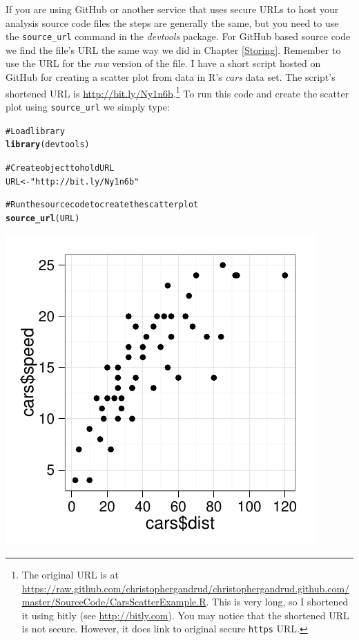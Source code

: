 \documentclass[ChapterTOCs,krantz1]{krantz}\usepackage{graphicx, color}
\makeatletter
\def\maxwidth{ %
  \ifdim\Gin@nat@width>\linewidth
    \linewidth
  \else
    \Gin@nat@width
  \fi
}
\newcommand{\hlfunctioncall}[1]{\textcolor[rgb]{0.501960784313725,0,0.329411764705882}{\textbf{#1}}}%
\newcommand{\hlstring}[1]{\textcolor[rgb]{0.6,0.6,1}{#1}}%
\newcommand{\hlcomment}[1]{\textcolor[rgb]{0.180392156862745,0.6,0.341176470588235}{#1}}%
\newenvironment{kframe}{%
 \def\at@end@of@kframe{}%
 \ifinner\ifhmode%
  \def\at@end@of@kframe{\end{minipage}}%
  \begin{minipage}{\columnwidth}%
 \fi\fi%
 \def\FrameCommand##1{\hskip\@totalleftmargin \hskip-\fboxsep
 \colorbox{shadecolor}{##1}\hskip-\fboxsep
     \hskip-\linewidth \hskip-\@totalleftmargin \hskip\columnwidth}%
 \MakeFramed {\advance\hsize-\width
   \@totalleftmargin\z@ \linewidth\hsize
   \@setminipage}}%
 {\par\unskip\endMakeFramed%
 \at@end@of@kframe}
\newenvironment{knitrout}{}{} %
\makeatother
\begin{document}
If you are using GitHub or another service that uses secure URLs to host your analysis source code files the steps are generally the same, but you need to use the \texttt{source\_url} command in the {\emph{devtools}} package. For GitHub based source code we find the file's URL the same way we did in Chapter \ref{Storing}. Remember to use the URL for the {\emph{raw}} version of the file. I have a short script hosted on GitHub for creating a scatter plot from data in R's {\emph{cars}} data set. The script's shortened URL is \url{http://bit.ly/Ny1n6b}.\footnote{The original URL is at \url{https://raw.github.com/christophergandrud/christophergandrud.github.com/master/SourceCode/CarsScatterExample.R}. This is very long, so I shortened it using bitly (see \url{http://bitly.com}). You may notice that the shortened URL is not secure. However, it does link to original secure {\tt{https}} URL.} To run this code and create the scatter plot using {\tt{source\_url}} we simply type:

\begin{knitrout}
\color{fgcolor}\begin{kframe}
\begin{alltt}
\hlcomment{# Load library}
\hlfunctioncall{library}(devtools)

\hlcomment{# Create object to hold URL}
URL <- \hlstring{"http://bit.ly/Ny1n6b"}

\hlcomment{# Run the source code to create the scatter plot}
\hlfunctioncall{source_url}(URL)
\end{alltt}
\end{kframe}

{\centering \includegraphics[width=\maxwidth]{images8/Ch8SourceURLExample} 

}


\end{knitrout}
\end{document}

